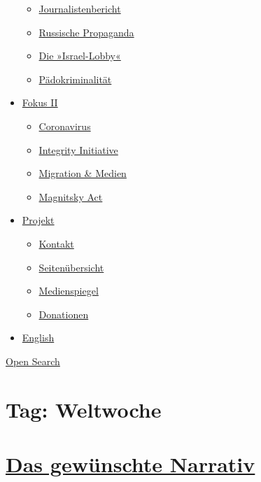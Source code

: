 \begin{itemize}
  \begin{itemize}
  \tightlist
  \item
    \href{https://swprs.org/bericht-eines-journalisten/}{Journalistenbericht}
  \item
    \href{https://swprs.org/russische-propaganda/}{Russische Propaganda}
  \item
    \href{https://swprs.org/die-israel-lobby-fakten-und-mythen/}{Die
    »Israel-Lobby«}
  \item
    \href{https://swprs.org/geopolitik-und-paedokriminalitaet/}{Pädokriminalität}
  \end{itemize}
\item
  \href{https://swprs.org/migration-und-medien/}{Fokus II}

  \begin{itemize}
  \tightlist
  \item
    \href{https://swprs.org/covid-19-hinweis-ii/}{Coronavirus}
  \item
    \href{https://swprs.org/die-integrity-initiative/}{Integrity
    Initiative}
  \item
    \href{https://swprs.org/migration-und-medien/}{Migration \& Medien}
  \item
    \href{https://swprs.org/der-fall-magnitsky/}{Magnitsky Act}
  \end{itemize}
\item
  \href{https://swprs.org/kontakt/}{Projekt}

  \begin{itemize}
  \tightlist
  \item
    \href{https://swprs.org/kontakt/}{Kontakt}
  \item
    \href{https://swprs.org/uebersicht/}{Seitenübersicht}
  \item
    \href{https://swprs.org/medienspiegel/}{Medienspiegel}
  \item
    \href{https://swprs.org/donationen/}{Donationen}
  \end{itemize}
\item
  \href{https://swprs.org/contact/}{English}
\end{itemize}

\protect\hyperlink{}{Open Search}

\hypertarget{tag-weltwoche}{%
\section{Tag: Weltwoche}\label{tag-weltwoche}}

\hypertarget{das-gewuxfcnschte-narrativ}{%
\section{\texorpdfstring{\href{https://swprs.org/2017/03/01/das-gewuenschte-narrativ/}{Das
gewünschte
Narrativ}}{Das gewünschte Narrativ}}\label{das-gewuxfcnschte-narrativ}}

